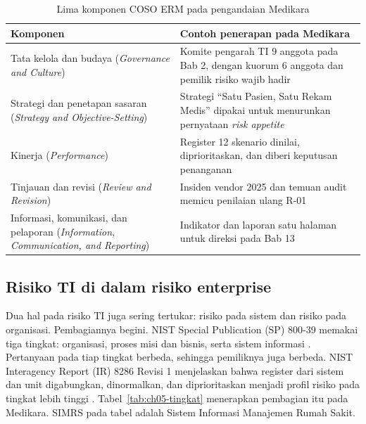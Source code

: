 \begin{table}[!htb]
  \centering\small
  \caption{Lima komponen COSO ERM pada pengandaian Medikara}\label{tab:ch05-coso}
  \begin{tabularx}{\textwidth}{|>{\raggedright\arraybackslash}p{}|>{\raggedright\arraybackslash}X|}
    \hline
    \textbf{Komponen} & \textbf{Contoh penerapan pada Medikara} \\ \hline
    Tata kelola dan budaya (\textit{Governance and Culture}) & Komite pengarah TI 9 anggota pada
    Bab 2, dengan kuorum 6 anggota dan pemilik risiko wajib hadir \\ \hline
    Strategi dan penetapan sasaran (\textit{Strategy and Objective-Setting}) & Strategi ``Satu
    Pasien, Satu Rekam Medis'' dipakai untuk menurunkan pernyataan \textit{risk appetite} \\ \hline
    Kinerja (\textit{Performance}) & Register 12 skenario dinilai, diprioritaskan, dan diberi
    keputusan penanganan \\ \hline
    Tinjauan dan revisi (\textit{Review and Revision}) & Insiden vendor 2025 dan temuan audit memicu
    penilaian ulang R-01 \\ \hline
    Informasi, komunikasi, dan pelaporan (\textit{Information, Communication, and Reporting}) &
    Indikator dan laporan satu halaman untuk direksi pada Bab 13 \\ \hline
  \end{tabularx}
\end{table}

\subsection*{Risiko TI di dalam risiko enterprise}

Dua hal pada risiko TI juga sering tertukar: risiko pada sistem dan risiko pada organisasi.
Pembagiannya begini. NIST Special Publication (SP) 800-39 memakai tiga tingkat: organisasi, proses
misi dan bisnis, serta sistem informasi \cite{c05-nist-sp80039}. Pertanyaan pada tiap tingkat
berbeda, sehingga pemiliknya juga berbeda. NIST Interagency Report (IR) 8286 Revisi 1 menjelaskan
bahwa register dari sistem dan unit digabungkan, dinormalkan, dan diprioritaskan menjadi profil
risiko pada tingkat lebih tinggi \cite{c05-nist-ir8286r1}. Tabel~\ref{tab:ch05-tingkat} menerapkan
pembagian itu pada Medikara. SIMRS pada tabel adalah Sistem Informasi Manajemen Rumah Sakit.


